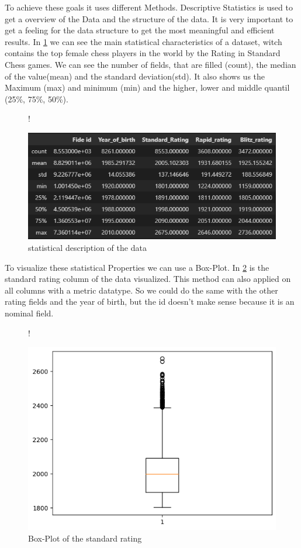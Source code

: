 \documentclass[a4paper, 12pt, oneside]{scrbook}
\begin{document}
			\noindent To achieve these goals it uses different Methods. Descriptive Statistics is used to get a overview of the Data and the structure of the data. It is very important to get a feeling for the data structure to get the most meaningful and efficient results. In \ref{fig:statistical_description} we can see the main statistical characteristics of a dataset, witch contains the top female chess players in the world by the Rating in Standard Chess games. We can see the number of fields, that are filled (count), the median of the value(mean) and the standard deviation(std). It also shows us the Maximum (max) and minimum (min) and the higher, lower and middle quantil (25\%, 75\%, 50\%).
			
			\begin{figure} [H]
				\centering
				\resizebox{\linewidth} {!} {
					\includegraphics{res/df_describes.png}
					
				}
				\caption{statistical description of the data}
				\label{fig:statistical_description}
			\end{figure}
		
			\noindent To visualize these statistical Properties we can use a Box-Plot. In \ref{fig:boxplot} is the standard rating column of the data visualized. This method can also applied on all columns with a metric datatype. So we could do the same with the other rating fields and the year of birth, but the id doesn't make sense because it is an nominal field. 
			
			\begin{figure} [H]
				\centering
				\resizebox{\linewidth} {!} {
					\includegraphics{res/boxplot.png}
					
				}
				\caption{Box-Plot of the standard rating}
				\label{fig:boxplot}
			\end{figure}
		
\end{document}
